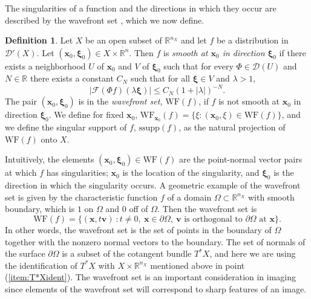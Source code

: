 \documentclass[a4paper,12pt]{amsart}
\numberwithin{equation}{section}
\theoremstyle{plain}
\numberwithin{theorem}{section}
\theoremstyle{definition}
\newtheorem{definition}[theorem]{Definition}
\theoremstyle{remark}
\theoremstyle{remark}
\theoremstyle{remark}
\newcommand{\abs}[1]{\left|#1\right|}                 %
\newcommand{\Dc}{\mathcal{D}}
\newcommand{\Fc}{\mathcal{F}}
\newcommand{\WF}{\mathrm{WF}}                         %
\newcommand{\wf}{\mathrm{WF}}                         %
\newcommand{\vv}{{\mathbf{v}}}
\newcommand{\vx}{{\mathbf{x}}}
\newcommand{\vxo}{\mathbf{x}_0}
\newcommand{\vxi}{{\boldsymbol{\xi}}}
\newcommand{\vxio}{{\boldsymbol{\xi}_0}}
\newcommand{\drn}{\dot{\mathbb{R}^n}}
\begin{document}
\noindent The singularities of a function and the directions in which they occur
are described by the wavefront set \cite[page
16]{duistermaat1996fourier}, which we now define.
\begin{definition}
\label{WF} Let $X$ be an open subset of $\mathbb{R}^{n_X}$ and let $f$ be a
distribution in $\mathcal{D}'(X)$.  Let $(\vx_0,\vxi_0)\in X\times
\drn$.  Then $f$ is \emph{smooth at $\vx_0$ in direction $\vxio$} if
there exists a neighborhood $U$ of $\vx_0$ and $V$ of $\vxi_0$ such
that for every $\Phi\in \Dc(U)$ and $N\in\mathbb{R}$ there exists a
constant $C_N$ such that for all $\vxi\in V$ {and $\lambda >1$},
\begin{equation}
\left|\Fc(\Phi f)(\lambda\vxi)\right|\leq C_N(1+\abs{\lambda})^{-N}.
\end{equation}
The pair $(\vx_0,\vxio)$ is in the \emph{wavefront set,} $\wf(f)$, if
$f$ is not smooth at $\vx_0$ in direction $\vxio$. We define for fixed $\vx_0$, $\WF_{\vx_0}(f) = \{\xi : (\vx_0,\xi) \in \WF(f)\}$, and we define the singular support of $f$, $\text{ssupp}(f)$, as the natural projection of $\WF(f)$ onto $X$.
\end{definition}


Intuitively, the elements 
$(\vxo,\vxio)\in \WF(f)$ are the point-normal vector pairs at
which $f$ has singularities; $\vxo$ is the location of the 
  singularity, and  $\vxio$ is the direction in which the
  singularity occurs.
  A
 geometric example of the wavefront set is given by the characteristic function $f$ of a domain $\Omega \subset \mathbb{R}^{n_X}$ with smooth boundary, which is $1$ on $\Omega$ and $0$ off of $\Omega$. Then the wavefront set is
\[
\WF(f) = \{(\vx,t\vv) \ : t \neq 0, \ \vx \in \partial \Omega, \ \mbox{$\vv$ is orthogonal to $\partial \Omega$ at $\vx$}\}.
\]
In other words, the wavefront set is the set of points in the boundary of $\Omega$ together with the nonzero normal vectors to the boundary. {The set of normals of the surface $\partial \Omega$ is a subset of the cotangent bundle $T^*X$, and here we are using the identification of $T^*X$ with $X \times \mathbb{R}^{n_X}$ mentioned above in point (\ref{item:T*Xident}).} The wavefront set is an important consideration in imaging since elements of the wavefront set will correspond to sharp features of an image.

\end{document}
